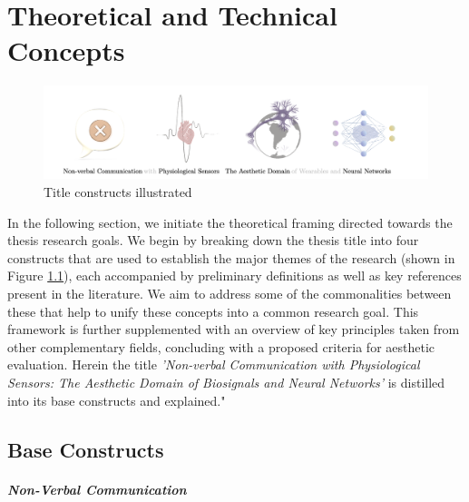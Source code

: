 

\chapter{Theoretical and Technical Concepts}
\label{cha:technical_concepts}

\begin{figure}[htbp]
	\centering
	\includegraphics[width=\textwidth]{Chapters/Figures/background/sec2_title_constructs_alpha_2.png}
	\caption{Title constructs illustrated}
	\label{fig:title_constructs}
\end{figure}

In the following section, we initiate the theoretical framing directed towards the thesis research goals. We begin by breaking down the thesis title into four constructs that are used to establish the major themes of the research (shown in Figure \ref{fig:title_constructs}), each accompanied by preliminary definitions as well as key references present in the literature. We aim to address some of the commonalities between these that help to unify these concepts into a common research goal. This framework is further supplemented with an overview of key principles taken from other complementary fields, concluding with a proposed criteria for aesthetic evaluation. Herein the title \textit{'Non-verbal Communication with Physiological Sensors: The Aesthetic Domain of Biosignals and Neural Networks'} is distilled into its base constructs and explained."

\section{Base Constructs}
\label{sec:title_constructs}

\paragraph{Non-Verbal Communication}

